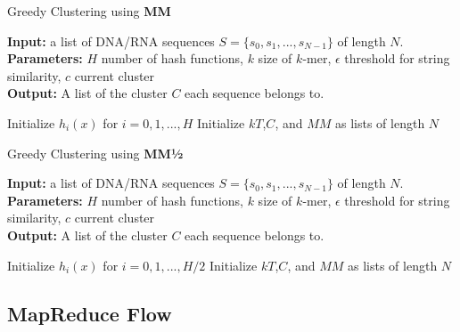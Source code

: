 \documentclass[../../main.tex]{subfiles}
\begin{document}
\begin{algorithm}
\caption{Greedy Clustering using {\bf MM}}\label{alg:minmaxclust}
\textbf{Input:} a list of DNA/RNA sequences $S=\{s_0,s_1,...,s_{N-1}\}$ of length $N$.\\
\textbf{Parameters:} $H$ number of hash functions, $k$ size of $k$-mer,	$\epsilon$ threshold for string similarity, $c$ current cluster \\
\textbf{Output:} A list of the cluster $C$ each sequence belongs to.
\begin{algorithmic}[1]
\State Initialize $h_i(x)$ for $i=0,1,...,H$
\State Initialize $kT$,$C$, and $MM$ as lists of length $N$
\EndFor
{}
					\Else
						\EndIf
					\EndIf
				\EndFor
				\EndIf
			\EndIf
		\EndFor
	\EndIf
\EndFor
\end{algorithmic}
\end{algorithm}

\begin{algorithm}
\caption{Greedy Clustering using {\bf MM½}}\label{alg:minmaxhalfclust}
\textbf{Input:} a list of DNA/RNA sequences $S=\{s_0,s_1,...,s_{N-1}\}$ of length $N$.\\
\textbf{Parameters:} $H$ number of hash functions, $k$ size of $k$-mer,	$\epsilon$ threshold for string similarity, $c$ current cluster \\
\textbf{Output:} A list of the cluster $C$ each sequence belongs to.
\begin{algorithmic}[1]
\State Initialize $h_i(x)$ for $i=0,1,...,H/2$
\State Initialize $kT$,$C$, and $MM$ as lists of length $N$
\EndFor
{}
					\EndIf
					\EndIf
				\EndFor
				\EndIf
			\EndIf
		\EndFor
	\EndIf
\EndFor
\end{algorithmic}
\end{algorithm}
\newpage

\subsection{MapReduce Flow}
\end{document}
